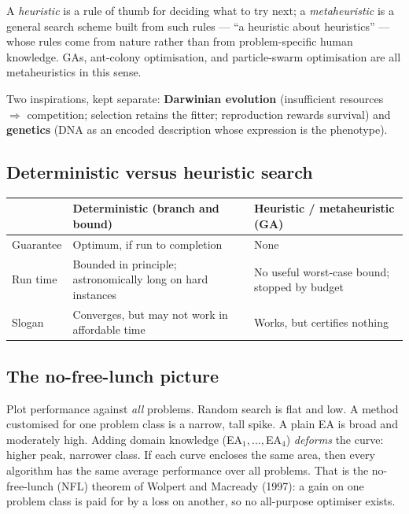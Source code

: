 \documentclass[11pt,a4paper]{article}
\begin{document}
A \emph{heuristic} is a rule of thumb for deciding what to try next; a
\emph{metaheuristic} is a general search scheme built from such rules --- ``a
heuristic about heuristics'' --- whose rules come from nature rather than from
problem-specific human knowledge. GAs, ant-colony optimisation, and
particle-swarm optimisation are all metaheuristics in this sense.

Two inspirations, kept separate: \textbf{Darwinian evolution} (insufficient
resources $\Rightarrow$ competition; selection retains the fitter;
reproduction rewards survival) and \textbf{genetics} (DNA as an encoded
description whose expression is the phenotype).

\subsection{Deterministic versus heuristic search}

\begin{center}
\begin{tabular}{@{}>{\raggedright\arraybackslash}p{}
  >{\raggedright\arraybackslash}p{}
  >{\raggedright\arraybackslash}p{}@{}}
\toprule
& Deterministic (branch and bound) & Heuristic / metaheuristic (GA)\\
\midrule
Guarantee & Optimum, if run to completion & None\\
Run time & Bounded in principle; astronomically long on hard instances & No useful worst-case bound; stopped by budget\\
Slogan & Converges, but may not work in affordable time & Works, but certifies nothing\\
\bottomrule
\end{tabular}
\end{center}

\subsection{The no-free-lunch picture}

Plot performance against \emph{all} problems. Random search is flat and low.
A method customised for one problem class is a narrow, tall spike. A plain EA
is broad and moderately high. Adding domain knowledge (EA$_1,\ldots,$EA$_4$)
\emph{deforms} the curve: higher peak, narrower class. If each curve encloses
the same area, then every algorithm has the same average performance over all
problems. That is the no-free-lunch (NFL) theorem of Wolpert and Macready
(1997): a gain on one problem class is paid for by a loss on another, so no
all-purpose optimiser exists.
\end{document}

